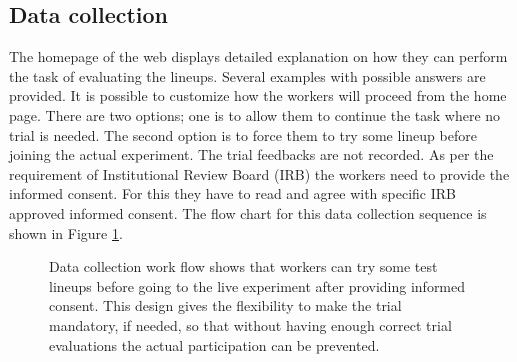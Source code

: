 \documentclass[11pt]{article}
\begin{document}
\subsection{Data collection} 

The homepage of the web displays detailed explanation on how they can perform the task of evaluating the lineups. Several examples with possible answers are provided. It is possible to customize how the workers will proceed from the home page. There are two options; one is to allow them to continue the task where no trial is needed. The second option is to force them to try some lineup before joining the actual experiment. The trial feedbacks are not recorded. As per the requirement of Institutional Review Board (IRB) the workers need to provide the informed consent. For this they have to read and agree with specific IRB approved informed consent. The flow chart for this data collection sequence is shown in Figure \ref{fig:turk_data_flow}.

\begin{figure}[hbtp]
   \centering
       \caption{Data collection work flow shows that workers can try some test lineups before going to the live experiment after providing informed consent. This design gives the flexibility to make the trial mandatory, if needed, so that without having enough correct trial evaluations the actual participation can be prevented.}
       \label{fig:turk_data_flow}
\end{figure}


\end{document}
